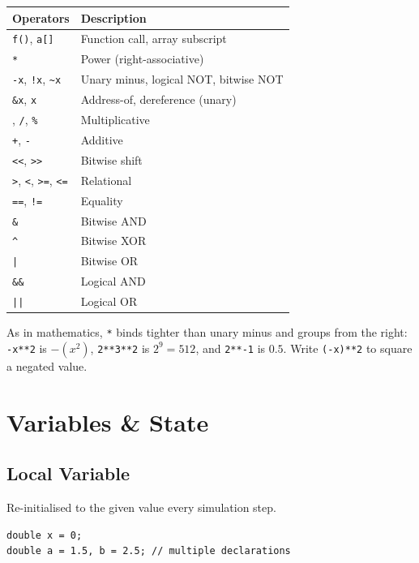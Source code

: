 \documentclass[11pt, a4paper]{article}
\newcommand{\code}[1]{\texttt{\small #1}}
\begin{document}
\begin{center}
\renewcommand{\arraystretch}{1.2}
\begin{tabular}{@{} L{5cm} L{6cm} @{}}
  \toprule
  \textbf{Operators} & \textbf{Description} \\
  \midrule
  \code{f()}, \code{a[]} & Function call, array subscript \\
  \code{**} & Power (right-associative) \\
  \code{-x}, \code{!x}, \code{\textasciitilde x} & Unary minus, logical NOT, bitwise NOT \\
  \code{\&x}, \code{*x} & Address-of, dereference (unary) \\
  \code{*}, \code{/}, \code{\%} & Multiplicative \\
  \code{+}, \code{-} & Additive \\
  \code{<<}, \code{>>} & Bitwise shift \\
  \code{>}, \code{<}, \code{>=}, \code{<=} & Relational \\
  \code{==}, \code{!=} & Equality \\
  \code{\&} & Bitwise AND \\
  \code{\textasciicircum} & Bitwise XOR \\
  \code{|} & Bitwise OR \\
  \code{\&\&} & Logical AND \\
  \code{||} & Logical OR \\
  \bottomrule
\end{tabular}
\end{center}

As in mathematics, \code{**} binds tighter than unary minus and groups from the
right: \code{-x**2} is $-(x^2)$, \code{2**3**2} is $2^9 = 512$, and
\code{2**-1} is $0.5$. Write \code{(-x)**2} to square a negated value.

\section{Variables \& State}

\subsection{Local Variable}

Re-initialised to the given value every simulation step.

\begin{lstlisting}
double x = 0;
double a = 1.5, b = 2.5; // multiple declarations
\end{lstlisting}
\end{document}
